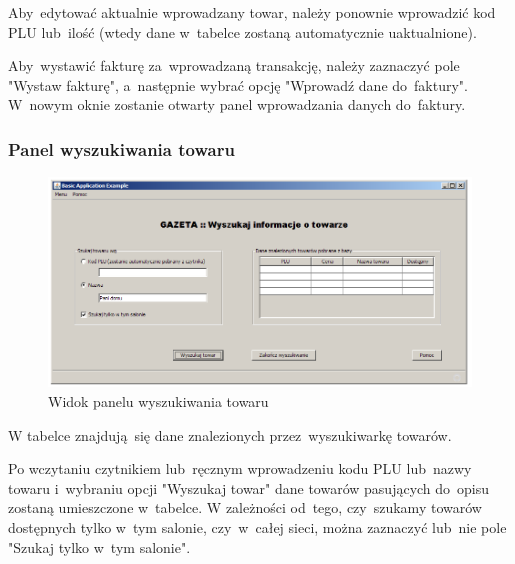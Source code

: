 Aby~edytować aktualnie wprowadzany towar, należy ponownie wprowadzić kod PLU lub~ilość (wtedy dane w~tabelce zostaną automatycznie uaktualnione).

Aby~wystawić fakturę za~wprowadzaną transakcję, należy zaznaczyć pole "Wystaw fakturę", a~następnie wybrać opcję "Wprowadź dane do~faktury". W~nowym oknie zostanie otwarty panel wprowadzania danych do~faktury.
\clearpage
\subsubsection{Panel wyszukiwania towaru}
\begin{figure}[h]
\begin{center}
\includegraphics[width=20cm,angle=90,keepaspectratio]{gfx/wyszukaj_produkt.png}
\end{center}
\caption{Widok panelu wyszukiwania towaru}
\end{figure}
W tabelce znajdują~się dane znalezionych przez~wyszukiwarkę towarów.

Po wczytaniu czytnikiem lub~ręcznym wprowadzeniu kodu PLU lub~nazwy towaru i~wybraniu opcji "Wyszukaj towar" dane towarów pasujących do~opisu zostaną umieszczone w~tabelce.
W zależności od~tego, czy~szukamy towarów dostępnych tylko w~tym salonie, czy~w~całej sieci, można zaznaczyć lub~nie pole "Szukaj tylko w~tym salonie".
\clearpage
